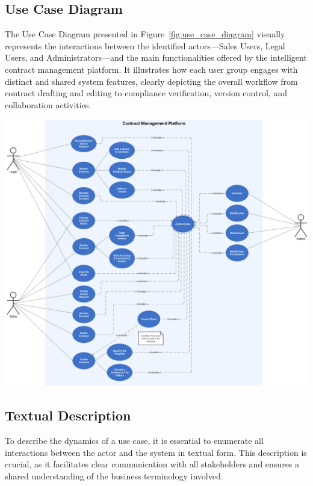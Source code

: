 \subsection{Use Case Diagram}
The Use Case Diagram presented in Figure~\ref{fig:use_case_diagram} visually represents the interactions between the identified actors—Sales Users, Legal Users, and Administrators—and the main functionalities offered by the intelligent contract management platform. It illustrates how each user group engages with distinct and shared system features, clearly depicting the overall workflow from contract drafting and editing to compliance verification, version control, and collaboration activities.

\begin{center}
    \centering
    \includegraphics[width=1\textwidth]{Images/Use Case Diagram.png}
    \label{fig:use_case_diagram}
\end{center}

\subsection{Textual Description}

To describe the dynamics of a use case, it is essential to enumerate all interactions between the actor and the system in textual form. This description is crucial, as it facilitates clear communication with all stakeholders and ensures a shared understanding of the business terminology involved.\newpage

